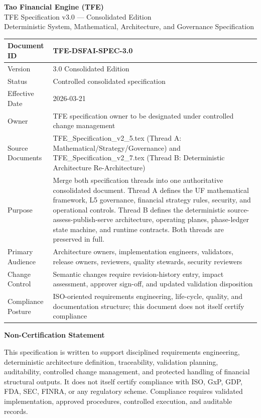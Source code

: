 \documentclass[11pt]{report}
\begin{document}
\begin{titlepage}
\centering
{\Huge \textbf{Tao Financial Engine (TFE)}}\\[0.35cm]
{\LARGE TFE Specification v3.0 --- Consolidated Edition}\\[0.25cm]
{\Large Deterministic System, Mathematical, Architecture, and Governance Specification}\\[0.9cm]

\renewcommand{\arraystretch}{1.18}
\begin{tabularx}{\textwidth}{|p{}|Y|}
\hline
Document ID & TFE-DSFAI-SPEC-3.0 \\\hline
Version & 3.0 Consolidated Edition \\\hline
Status & Controlled consolidated specification \\\hline
Effective Date & 2026-03-21 \\\hline
Owner & TFE specification owner to be designated under controlled change management \\\hline
Source Documents & TFE\_Specification\_v2\_5.tex (Thread A: Mathematical/Strategy/Governance) and TFE\_Specification\_v2\_7.tex (Thread B: Deterministic Architecture Re-Architecture) \\\hline
Purpose & Merge both specification threads into one authoritative consolidated document. Thread A defines the UF mathematical framework, L5 governance, financial strategy rules, security, and operational controls. Thread B defines the deterministic source-assess-publish-serve architecture, operating planes, phase-ledger state machine, and runtime contracts. Both threads are preserved in full. \\\hline
Primary Audience & Architecture owners, implementation engineers, validators, release owners, reviewers, quality stewards, security reviewers \\\hline
Change Control & Semantic changes require revision-history entry, impact assessment, approver sign-off, and updated validation disposition \\\hline
Compliance Posture & ISO-oriented requirements engineering, life-cycle, quality, and documentation structure; this document does not itself certify compliance \\\hline
\end{tabularx}

\vfill
{\large \textbf{Non-Certification Statement}}\\[0.2cm]
\parbox{0.93\textwidth}{This specification is written to support disciplined requirements engineering, deterministic architecture definition, traceability, validation planning, auditability, controlled change management, and protected handling of financial structural outputs. It does not itself certify compliance with ISO, GxP, GDP, FDA, SEC, FINRA, or any regulatory scheme. Compliance requires validated implementation, approved procedures, controlled execution, and auditable records.}
\vfill
\end{titlepage}
\end{document}
